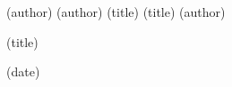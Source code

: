 {  (author){%
                {\thespine(author)}
  }{\def\@authorRT{99999}}%
  (title){%
                {\thespine(title)}
  }{\def\@titleRT{99999}}%
  \fitboxmin{\@fbratio}{\@authorRT,\@titleRT}
  (author){%
    \begin{lrbox}{\myauthorbox}%
      \begin{minipage}[c][\novathesis@spinetextwidth][c]{\thespine(text,author,len)}%
      \end{minipage}%
    \end{lrbox}%
  }{}%
  (title){%
    \begin{lrbox}{\mytitlebox}%
      \begin{minipage}[c][\novathesis@spinetextwidth][c]{\thespine(text,title,len)}%
      \end{minipage}%
    \end{lrbox}%
  }{}%
  (date){%
}}
